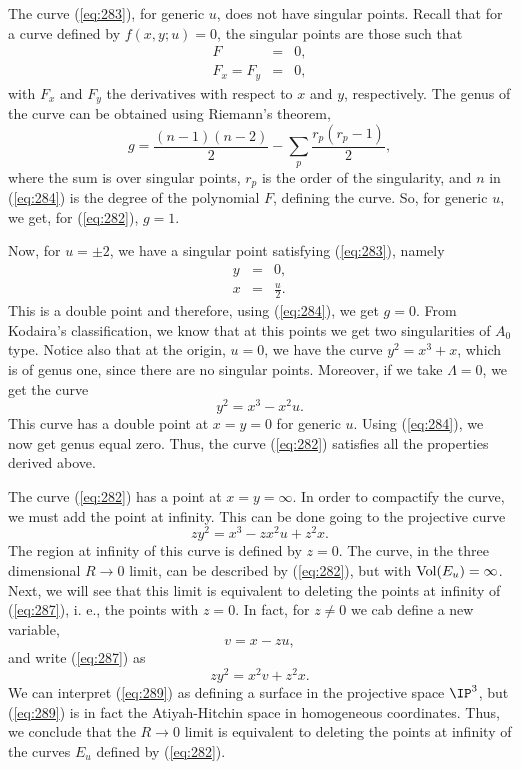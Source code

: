 The curve (\ref{eq:283}), for generic $u$, does not have singular
points. Recall that for a curve defined by $f(x,y;u)=0$, the
singular points are those such that
\begin{eqnarray}
F & = & 0, \nonumber \\
F_x = F_y & = & 0,
\label{eq:283}
\end{eqnarray}
with $F_x$ and $F_y$ the derivatives with respect to $x$ and $y$,
respectively. The genus of the curve can be obtained using
Riemann's theorem,
\begin{equation}
g = \frac {(n-1)(n-2)}{2} - \sum_p \frac {r_p(r_p-1)}{2}, 
\label{eq:284}
\end{equation}
where the sum is over singular points, $r_p$ is the order of the
singularity, and $n$ in (\ref{eq:284}) is the degree of the
polynomial $F$, defining the curve. So, for generic $u$, we get,
for (\ref{eq:282}), $g=1$.
  
Now, for $u=\pm 2$, we have a singular point satisfying
(\ref{eq:283}), namely
\begin{eqnarray}
y & = & 0, \nonumber \\
x & = & \frac {u}{2}.
\label{eq:285}
\end{eqnarray}
This is a double point and therefore, using (\ref{eq:284}), we
get $g=0$. From Kodaira's classification, we know that at this
points we get two singularities of $A_0$ type. Notice also that
at the origin, $u=0$, we have the curve $y^2=x^3+x$, which is of
genus one, since there are no singular points. Moreover, if we
take $\Lambda=0$, we get the curve
\begin{equation}
y^2 = x^3 - x^2 u.
\label{eq:286}
\end{equation}
This curve has a double point at $x=y=0$ for generic $u$. Using
(\ref{eq:284}), we now get genus equal zero. Thus, the curve
(\ref{eq:282}) satisfies all the properties derived above.
  
The curve (\ref{eq:282}) has a point at $x=y=\infty$. In order to
compactify the curve, we must add the point at infinity. This can
be done going to the projective curve
\begin{equation}
zy^2 = x^3 - zx^2 u + z^2 x.
\label{eq:287}
\end{equation}
The region at infinity of this curve is defined by $z=0$. The
curve, in the three dimensional $R \rightarrow 0$ limit, can be
described by (\ref{eq:282}), but with $\hbox{Vol}(E_u)=\infty$.
Next, we will see that this limit is equivalent to deleting the
points at infinity of (\ref{eq:287}), i. e., the points with
$z=0$. In fact, for $z \neq 0$ we cab define a new variable,
\begin{equation}
v=x-zu,
\label{eq:288}
\end{equation}
and write (\ref{eq:287}) as
\begin{equation}
zy^2 = x^2 v +z^2 x.
\label{eq:289}
\end{equation}
We can interpret (\ref{eq:289}) as defining a surface in the
projective space $\IP^3$, but (\ref{eq:289}) is in fact the
Atiyah-Hitchin space in homogeneous coordinates. Thus, we
conclude that the $R \rightarrow 0$ limit is equivalent to
deleting the points at infinity of the curves $E_u$ defined by
(\ref{eq:282}).
  
